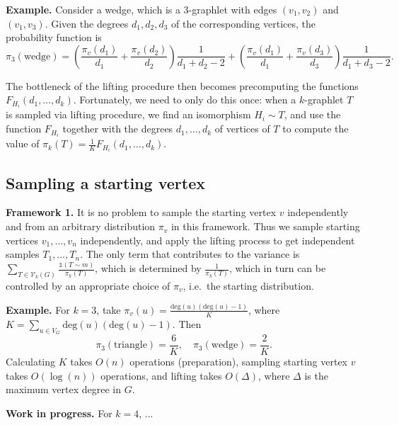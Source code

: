 \documentclass[11pt]{article}
\def\ind{\mathds{1}}
\def\deg{\mathrm{deg}}
\def\cV{\mathcal{V}}
\theoremstyle{remark}
\theoremstyle{definition}
\begin{document}
	\textbf{Example.} Consider a wedge, which is a 3-graphlet with edges $(v_1,v_2)$ and 
	$(v_1,v_3)$. Given the degrees $d_1, d_2, d_3$ of the corresponding 
	vertices, the probability function is
	\begin{equation*}
		\pi_3(\mathrm{wedge}) = \left( \frac{\pi_v(d_1)}{d_1} + \frac{\pi_v(d_2)}{d_2}\right) 
		\frac{1}{d_1+d_2-2} + \left( \frac{\pi_v(d_1)}{d_1} + \frac{\pi_v(d_3)}{d_3}\right) 
		\frac{1}{d_1+d_3-2}.
	\end{equation*}

	The bottleneck of the lifting procedure then becomes precomputing the functions 
	$F_{H_i}(d_1,\ldots,d_k)$. 
	Fortunately, we need to only do this once: when a $k$-graphlet $T$ is sampled via lifting 
	procedure, we find an isomorphism $H_i \sim T$, and use the function $F_{H_i}$ together 
	with the degrees $d_1,\ldots,d_k$ of vertices of $T$ to compute the value of 
	$\pi_k(T) = \frac{1}{K} F_{H_i}(d_1,\ldots,d_k)$.

	\subsection{Sampling a starting vertex}
	
	\textbf{Framework 1.} It is no problem to sample the starting vertex $v$ 
	independently and from an arbitrary distribution $\pi_v$ in this framework.
	Thus we sample starting vertices $v_1, \ldots, v_n$ independently, and apply the 
	lifting process to get independent samples $T_1,\ldots, T_n$. 
	The only term that contributes to the variance is 
	$\sum_{T \in \cV_k(G)} \frac{\ind(T\sim m)}{\pi_k(T)}$,
	which is determined by $\frac{1}{\pi_k(T)}$, which in turn can be controlled by an 
	appropriate choice of $\pi_v$, i.e.~the starting distribution.
	
	\textbf{Example.}  For $k=3$, take $\pi_v(u) = \frac{\deg(u)(\deg(u)-1)}{K}$, where 
	$K=\sum_{u\in V_G} \deg(u)(\deg(u)-1)$. 
	Then
	\begin{equation*}
		\pi_3(\mathrm{triangle}) = \frac{6}{K}, \quad \pi_3(\mathrm{wedge}) = \frac{2}{K}.
	\end{equation*}
	Calculating $K$ takes $O(n)$ operations (preparation), sampling starting vertex $v$ takes 
	$O(\log(n))$ operations, and lifting takes $O(\Delta)$, where $\Delta$ is the maximum 
	vertex degree in $G$.
	
	\textbf{Work in progress.} For $k=4$, ...
\end{document}
